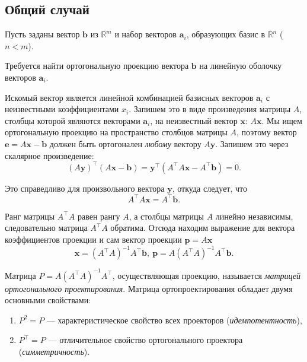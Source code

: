 \documentclass[11pt,a4paper]{article}
\providecommand{\tightlist}{%
      \setlength{\itemsep}{0pt}\setlength{\parskip}{0pt}}
\begin{document}
\hypertarget{ux43eux431ux449ux438ux439-ux441ux43bux443ux447ux430ux439}{%
\subsection{Общий
случай}\label{ux43eux431ux449ux438ux439-ux441ux43bux443ux447ux430ux439}}

Пусть заданы вектор \(\mathbf{b}\) из \(\mathbb{R}^m\) и набор векторов
\(\mathbf{a}_i\), образующих базис в \(\mathbb{R}^n\) (\(n<m\)).

Требуется найти ортогональную проекцию вектора \(\mathbf{b}\) на
линейную оболочку векторов \(\mathbf{a}_i\).

Искомый вектор является линейной комбинацией базисных векторов
\(\mathbf{a}_i\) с неизвестными коэффициентами \(x_i\). Запишем это в
виде произведения матрицы \(A\), столбцы которой являются векторами
\(\mathbf{a}_i\), на неизвестный вектор \(\mathbf{x}\): \(A\mathbf{x}\).
Мы ищем ортогональную проекцию на пространство столбцов матрицы \(A\),
поэтому вектор \(\mathbf{e} = A\mathbf{x} - \mathbf{b}\) должен быть
ортогонален \emph{любому} вектору \(A\mathbf{y}\). Запишем это через
скалярное произведение: \[
  (A \mathbf{y})^\top(A\mathbf{x} - \mathbf{b}) = \mathbf{y}^\top (A^\top A \mathbf{x} - A^\top \mathbf{b}) = 0.
\]

Это справедливо для произвольного вектора \(\mathbf{y}\), откуда
следует, что \[
  A^\top A \mathbf{x} = A^\top \mathbf{b}.
\]

Ранг матрицы \(A^\top A\) равен рангу \(A\), а столбцы матрицы \(A\)
линейно независимы, следовательно матрица \(A^\top A\) обратима. Отсюда
находим выражение для вектора коэффициентов проекции и сам вектор
проекции \(\mathbf{p} = A\mathbf{x}\) \[
  \mathbf{x} = (A^\top A)^{-1} A^\top \mathbf{b}, \
  \mathbf{p} = A (A^\top A)^{-1} A^\top \mathbf{b}.
\]

Матрица \(P = A (A^\top A)^{-1} A^\top\), осуществляющая проекцию,
называется \emph{матрицей ортогонального проектирования}.
Матрица ортопроектирования обладает двумя основными свойствами:

\begin{enumerate}
\def\labelenumi{\arabic{enumi}.}
\tightlist
\item
  \(P^2 = P\) --- характеристическое свойство всех проекторов
  (\emph{идемпотентность}),
\item
  \(P^\top = P\) --- отличительное свойство ортогонального проектора
  (\emph{симметричность}).
\end{enumerate}
\end{document}
